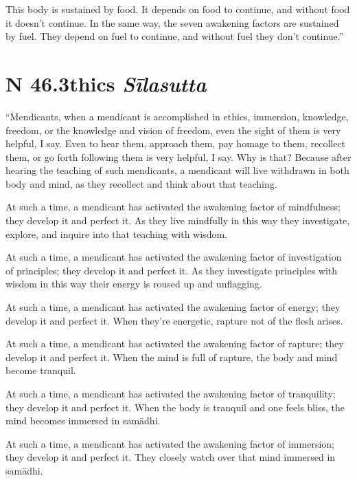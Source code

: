 \documentclass[12pt,openany]{book}%
\newcommand*{\suttatitleacronym}[1]{\smaller[2]{#1}\vspace*{.3em}}
\newcommand*{\suttatitletranslation}[1]{\linebreak{#1}}
\newcommand*{\suttatitleroot}[1]{\linebreak\smaller[2]\itshape{#1}}
\newcommand*{\tocacronym}[1]{\hspace*{-3.3em}{#1}\quad}
\newcommand*{\toctranslation}[1]{#1}
\newcommand*{\tocroot}[1]{(\textit{#1})}
\begin{document}
This body is sustained by food. It depends on food to continue, and without food it doesn’t continue. In the same way, the seven awakening factors are sustained by fuel. They depend on fuel to continue, and without fuel they don’t continue.” 

%
\section*{{\suttatitleacronym SN 46.3}{\suttatitletranslation Ethics }{\suttatitleroot Sīlasutta}}
\addcontentsline{toc}{section}{\tocacronym{SN 46.3} \toctranslation{Ethics } \tocroot{Sīlasutta}}

“Mendicants, when a mendicant is accomplished in ethics, immersion, knowledge, freedom, or the knowledge and vision of freedom, even the sight of them is very helpful, I say. Even to hear them, approach them, pay homage to them, recollect them, or go forth following them is very helpful, I say. Why is that? Because after hearing the teaching of such mendicants, a mendicant will live withdrawn in both body and mind, as they recollect and think about that teaching. 

At such a time, a mendicant has activated the awakening factor of mindfulness; they develop it and perfect it. As they live mindfully in this way they investigate, explore, and inquire into that teaching with wisdom. 

At such a time, a mendicant has activated the awakening factor of investigation of principles; they develop it and perfect it. As they investigate principles with wisdom in this way their energy is roused up and unflagging. 

At such a time, a mendicant has activated the awakening factor of energy; they develop it and perfect it. When they’re energetic, rapture not of the flesh arises. 

At such a time, a mendicant has activated the awakening factor of rapture; they develop it and perfect it. When the mind is full of rapture, the body and mind become tranquil. 

At such a time, a mendicant has activated the awakening factor of tranquility; they develop it and perfect it. When the body is tranquil and one feels bliss, the mind becomes immersed in \textsanskrit{samādhi}. 

At such a time, a mendicant has activated the awakening factor of immersion; they develop it and perfect it. They closely watch over that mind immersed in \textsanskrit{samādhi}. 
\end{document}
